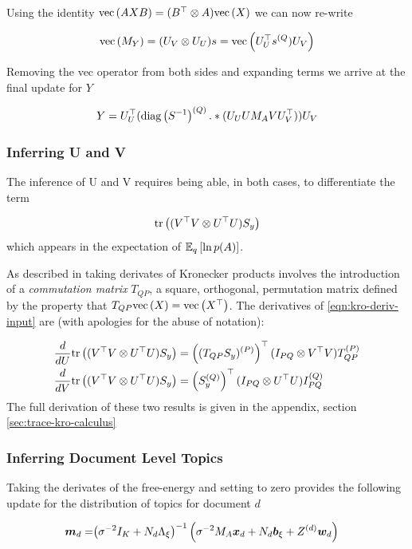 Using the identity $\vecf{AXB} = (B\T \otimes A)\vecf{X}$ we can now re-write

\begin{align}
\vecf{M_Y} = (U_V \otimes U_U)s = \vecf{U_U^\top s^{(Q}) U_V}
\end{align}

Removing the vec operator from both sides and expanding terms we arrive at the final update for $Y$

\begin{align}
Y = U_U^\top (\diag{\inv{S}}^{(Q)} .* (U_U U M_A V U_V^\top)) U_V
\end{align}

\subsubsection{Inferring U and V}
The inference of U and V requires being able, in both cases, to differentiate the term

\begin{align}
\Tr{(V\T V \otimes U\T U)S_y} \label{eqn:kro-deriv-input}
\end{align}
which appears in the expectation of $\ex{\ln p(A)}{q}$.

As described in \cite{Minka2000a} taking derivates of Kronecker products involves the introduction of a \emph{commutation matrix} $T_{QP}$, a square, orthogonal, permutation matrix defined by the property that $T_{QP} \vecf{X} = \vecf{X\T}$. The derivatives of \eqref{eqn:kro-deriv-input} are (with apologies for the abuse of notation):

\begin{align}
\frac{d}{dU} \Tr{(V\T V \otimes U\T U)S_y} 
& = \left( \vt{(T_{QP} S_y)}{P} \right)\T (I_{PQ} \otimes V\T V)\vt{T_{QP}}{P}
\\
\frac{d}{dV} \Tr{(V\T V \otimes U\T U)S_y} 
& = \left(\vt{S_y}{Q}\right)\T (I_{PQ} \otimes U\T U) \vt{I_{PQ}}{Q}
\end{align}
The full derivation of these two results is given in the appendix, section \ref{sec:trace-kro-calculus}


\subsubsection{Inferring Document Level Topics}
Taking the derivates of the free-energy and setting to zero provides the following update for the distribution of topics for document $d$

\begin{align}
\md = & \invb{\sigma^{-2}I_K + N_d \Axi} \left(\sigma^{-2} M_A \xd  + N_d \bxi + Z^{(d)}\vv{w}_d \right )
\end{align}

